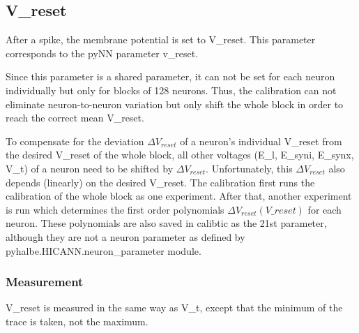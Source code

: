 \documentclass[12pt,a4paper,bibliography=totocnumbered,listof=totocnumbered]{scrartcl}
\begin{document}
\subsection{V\_reset}
After a spike, the membrane potential is set to V\_reset. This parameter corresponds to the pyNN parameter v\_reset.

Since this parameter is a shared parameter, it can not be set for each neuron individually but only for blocks of 128 neurons. Thus, the calibration can not eliminate neuron-to-neuron variation but only shift the whole block in order to reach the correct mean V\_reset.

To compensate for the deviation $\Delta V_{reset}$ of a neuron's individual V\_reset from the desired V\_reset of the whole block, all other voltages (E\_l, E\_syni, E\_synx, V\_t) of a neuron need to be shifted by $\Delta V_{reset}$. Unfortunately, this $\Delta V_{reset}$ also depends (linearly) on the desired V\_reset. The calibration first runs the calibration of the whole block as one experiment. After that, another experiment is run which determines the first order polynomials $\Delta V_{reset}(V\_reset)$ for each neuron. These polynomials are also saved in calibtic as the 21st parameter, although they are not a neuron parameter as defined by pyhalbe.HICANN.neuron\_parameter module.

\subsubsection*{Measurement}
V\_reset is measured in the same way as V\_t, except that the minimum of the trace is taken, not the maximum.
\end{document}
